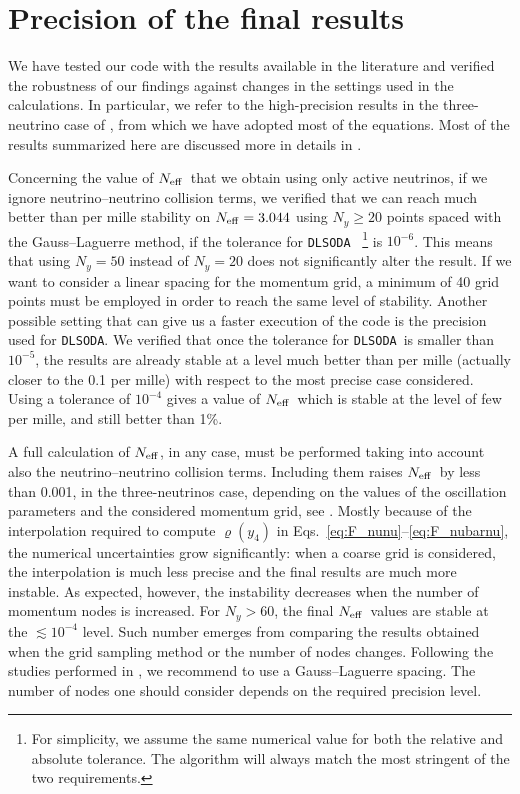 \documentclass[notitlepage,nofootinbib,showpacs,preprintnumbers,amsmath,amssymb,superscriptaddress,prd,onecolumn]{revtex4-1}
\newcommand{\Neff}{\ensuremath{N_{\rm eff}}}
\newcommand{\dlsoda}{\texttt{DLSODA}}
\begin{document}
\section{Precision of the final results}
\label{ssec:precision}
We have tested our code with the results available in the literature and
verified the robustness of our findings against changes in the settings used in the calculations.
In particular, we refer to the high-precision results in the three-neutrino case of \cite{deSalas:2016ztq},
from which we have adopted most of the equations.
Most of the results summarized here are discussed more in details in \cite{Gariazzo:2019gyi,Bennett:2020zkv}.

Concerning the value of \Neff\ that we obtain using only active neutrinos,
if we ignore neutrino--neutrino collision terms,
we verified that we can reach much better than per mille stability on $\Neff=3.044$
using $N_y\geq20$ points spaced with the Gauss--Laguerre method,
if the tolerance for \dlsoda~%
\footnote{For simplicity, we assume the same numerical value for both the relative and absolute tolerance.
The algorithm will always match the most stringent of the two requirements.}
is $10^{-6}$.
This means that using $N_y=50$ instead of $N_y=20$ does not significantly alter the result.
If we want to consider a linear spacing for the momentum grid,
a minimum of 40 grid points must be employed in order to reach the same level of stability.
Another possible setting that can give us a faster execution of the code is the precision
used for \dlsoda.
We verified that once the tolerance for \dlsoda\ is smaller than $10^{-5}$,
the results are already stable at a level much better than per mille
(actually closer to the 0.1 per mille)
with respect to the most precise case considered.
Using a tolerance of $10^{-4}$ gives a value of \Neff\ which is stable
at the level of few per mille, and still better than 1\%.

A full calculation of \Neff, in any case, must be performed taking into account also the neutrino--neutrino collision terms.
Including them raises \Neff\ by less than 0.001, in the three-neutrinos case,
depending on the values of the oscillation parameters and the considered momentum grid,
see \cite{Bennett:2020zkv}.
Mostly because of the interpolation required to compute $\varrho(y_4)$
in Eqs.~\eqref{eq:F_nunu}--\eqref{eq:F_nubarnu},
the numerical uncertainties grow significantly:
when a coarse grid is considered, the interpolation is much less precise
and the final results are much more instable.
As expected, however, the instability decreases when the number of momentum nodes is increased.
For $N_y>60$, the final \Neff\ values are stable at the $\lesssim10^{-4}$ level.
Such number emerges from comparing the results obtained when the grid sampling method or the number of nodes changes.
Following the studies performed in \cite{Bennett:2020zkv}, we recommend to use a Gauss--Laguerre spacing.
The number of nodes one should consider depends on the required precision level.
\end{document}
